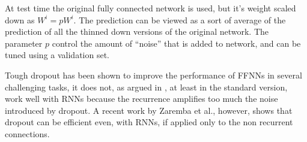 At test time the original fully connected network is used, but it's weight scaled down as $W^{i} = pW^{i}$. The prediction can be viewed as a sort of average of the prediction of all the thinned down versions of the original network. The parameter $p$ control the amount of ``noise'' that is added to network, and can be tuned using a validation set.


Tough dropout has been shown \cite{dropout} to improve the performance of FFNNs in several challenging tasks, it does not, as argued in \cite{dropoutBayer}, at least in the standard version, work well with RNNs because the recurrence amplifies too much the noise introduced by dropout. A recent work by Zaremba et al., however, shows that dropout can be efficient even, with RNNs, if applied only to the non recurrent connections\cite{dropoutRNNs}.
